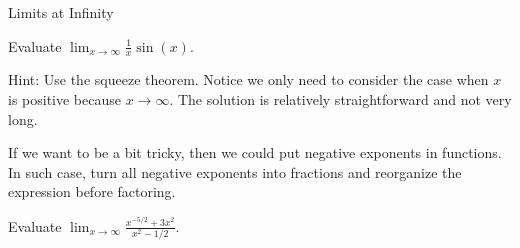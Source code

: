 \documentclass[../main.tex]{subfiles}
\begin{document}
\begin{lesson}{Limits at Infinity}
  \begin{example}
    Evaluate \(\lim_{x \to \infty} \frac{1}{x} \sin(x)\).

    {\scriptsize Hint: Use the squeeze theorem. Notice we only need to consider the case when \(x\) is positive because \(x \to \infty\). The solution is relatively straightforward and not very long.}

  \end{example}

  If we want to be a bit tricky, then we could put negative exponents in functions.  In such case, turn all negative exponents into fractions and reorganize the expression before factoring.
  \begin{example}
    Evaluate \(\lim_{x \to \infty} \frac{x^{-5/2} + 3x^{2}}{x^{2} - 1/2}\). 
  \end{example}
\end{lesson}
\end{document}
